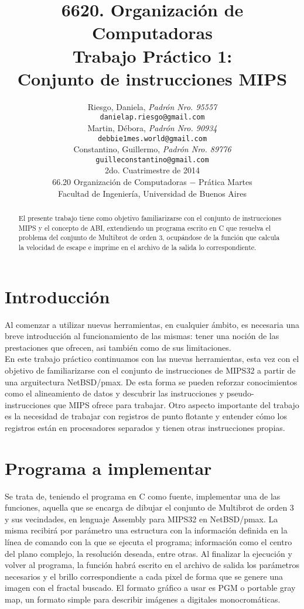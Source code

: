 \documentclass[a4paper,10pt]{article}
\title{ \textbf{ 6620. Organizaci\'on de Computadoras\\
Trabajo Pr\'actico 1: \\
Conjunto de instrucciones MIPS}}
\author{ Riesgo, Daniela, \textit{Padr\'on Nro. 95557} \\
\texttt{ danielap.riesgo@gmail.com } \\[2.5ex]
Martin, D\'ebora, \textit{Padr\'on Nro. 90934} \\
\texttt{ debbie1mes.world@gmail.com } \\[2.5ex]
Constantino, Guillermo, \textit{Padr\'on Nro. 89776} \\
\texttt{ guilleconstantino@gmail.com } \\[2.5ex]
\normalsize{2do. Cuatrimestre de 2014} \\
\normalsize{66.20 Organizaci\'on de Computadoras $-$ Pr\'atica Martes} \\
\normalsize{Facultad de Ingenier\'ia, Universidad de Buenos Aires} \\
}
\date{}
\begin{document}
\maketitle
\thispagestyle{empty} %

\newpage
\tableofcontents
\newpage


\begin{abstract}
El presente trabajo tiene como objetivo familiarizarse con el conjunto de instrucciones MIPS y el concepto de ABI, extendiendo un programa escrito en C que resuelva el problema del conjunto de Multibrot de orden 3, ocupándose de la funci\'on que calcula la velocidad de escape e imprime en el archivo de la salida lo correspondiente.

\end{abstract}




\setcounter{page}{2}
\section{Introducci\'on}
Al comenzar a utilizar nuevas herramientas, en cualquier \'ambito, es necesaria una breve introducci\'on al funcionamiento de las mismas: tener una noci\'on de las prestaciones que ofrecen, asi tambi\'en como de sus limitaciones.\\
En este trabajo pr\'actico continuamos con las nuevas herramientas, esta vez con el objetivo de 
familiarizarse con el conjunto de instrucciones de MIPS32 a partir de una arguitectura NetBSD/pmax.
De esta forma se pueden reforzar conocimientos como el alineamiento de datos y descubrir las 
instrucciones y pseudo-instrucciones que MIPS ofrece para trabajar.
Otro aspecto importante del trabajo es la necesidad de trabajar con registros de punto flotante y 
entender c\'omo los registros est\'an en procesadores separados y tienen otras instrucciones propias.




\section{Programa a implementar}
Se trata de, teniendo el programa en C como fuente, implementar una de las funciones, aquella que se encarga 
de dibujar el conjunto de Multibrot de orden 3 y sus vecindades, en lenguaje Assembly para MIPS32 
en NetBSD/pmax.
La misma recibir\'a por par\'ametro una estructura con la informaci\'on definida en la l\'inea de 
comando con la que se ejecuta el programa; información como el centro del plano complejo, la resoluci\'on deseada, entre otras.
Al finalizar la ejecuci\'on y volver al programa, la funci\'on habr\'a escrito en el archivo de salida 
los par\'ametros necesarios y el brillo correspondiente a cada pixel de forma que se genere una imagen con el fractal buscado.
El formato gr\'afico a usar es PGM o portable gray map, un formato simple para describir im\'agenes a
digitales monocrom\'aticas.
\end{document}
